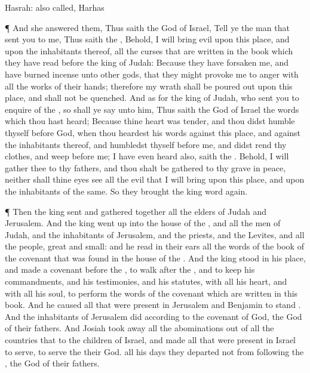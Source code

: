 {{Hasrah: also called, Harhas}
\par }{\PP {}¶ And she
answered them, Thus
saith the
{}
God of
Israel,
Tell ye the
man that
sent you to me,
Thus
saith the
{}, Behold, I will
bring
evil upon this
place, and upon the
inhabitants thereof,
{} all the
curses that are
written in the
book which they have
read
before the
king of
Judah:
Because they have
forsaken me, and have burned
incense unto
other
gods, that they might provoke me to
anger with all the
works of their
hands; therefore my
wrath shall be poured
out upon this
place, and shall not be
quenched.
And as
for the
king of
Judah, who
sent you to
enquire of the
{}, so shall ye
say unto him, Thus
saith the
{}
God of
Israel
{} the
words which thou hast
heard;
Because thine
heart was
tender, and thou didst
humble thyself
before
God, when thou
heardest his
words against this
place, and against the
inhabitants thereof, and
humbledst thyself
before me, and didst
rend thy
clothes, and
weep
before me; I have even
heard
{} also,
saith the
{}.
Behold, I will
gather thee to thy
fathers, and thou shalt be
gathered to thy
grave in
peace, neither shall thine
eyes
see all the
evil that I will
bring upon this
place, and upon the
inhabitants of the same. So they
brought the
king
word
again.
\par }{\PP {}¶ Then the
king
sent and gathered
together all the
elders of
Judah and
Jerusalem.
And the
king went
up into the
house of the
{}, and all the
men of
Judah, and the
inhabitants of
Jerusalem, and the
priests, and the
Levites, and all the
people,
great and
small: and he
read in their
ears all the
words of the
book of the
covenant that was
found in the
house of the
{}.
And the
king
stood in his
place, and
made a
covenant
before the
{}, to
walk
after the
{}, and to
keep his
commandments, and his
testimonies, and his
statutes, with all his
heart, and with all his
soul, to
perform the
words of the
covenant which are
written in this
book.
And he caused all that were
present in
Jerusalem and
Benjamin to
stand
{}. And the
inhabitants of
Jerusalem
did according to the
covenant of
God, the
God of their
fathers.
And
Josiah took
away all the
abominations out of all the
countries that
{} to the
children of
Israel, and made all that were
present in
Israel to
serve,
{} to
serve the
{} their
God.
{} all his
days they
departed not from
following the
{}, the
God of their
fathers.

}
